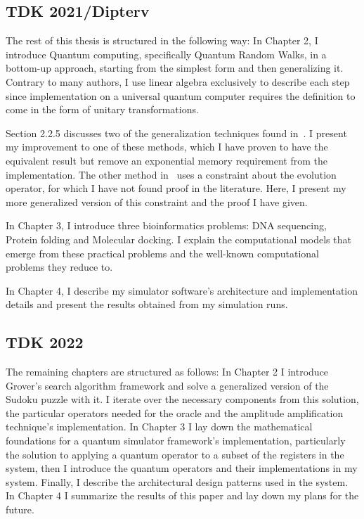 \subsection{TDK 2021/Dipterv}

The rest of this thesis is structured in the following way: In Chapter 2, I introduce Quantum computing, specifically Quantum Random Walks, in a bottom-up approach, starting from the simplest form and then generalizing it. Contrary to many authors, I use linear algebra exclusively to describe each step since implementation on a universal quantum computer requires the definition to come in the form of unitary transformations.

Section 2.2.5 discusses two of the generalization techniques found in~\cite{Portugal}. I present my improvement to one of these methods, which I have proven to have the equivalent result but remove an exponential memory requirement from the implementation. The other method in~\cite{Portugal} uses a constraint about the evolution operator, for which I have not found proof in the literature. Here, I present my more generalized version of this constraint and the proof I have given.

In Chapter 3, I introduce three bioinformatics problems: DNA sequencing, Protein folding and Molecular docking. I explain the computational models that emerge from these practical problems and the well-known computational problems they reduce to.

In Chapter 4, I describe my simulator software's architecture and implementation details and present the results obtained from my simulation runs.

\subsection{TDK 2022}

The remaining chapters are structured as follows: In Chapter 2 I introduce Grover's search algorithm framework and solve a generalized version of the Sudoku puzzle with it. I iterate over the necessary components from this solution, the particular operators needed for the oracle and the amplitude amplification technique's implementation. In Chapter 3 I lay down the mathematical foundations for a quantum simulator framework's implementation, particularly the solution to applying a quantum operator to a subset of the registers in the system, then I introduce the quantum operators and their implementations in my system. Finally, I describe the architectural design patterns used in the system. In Chapter 4 I summarize the results of this paper and lay down my plans for the future.